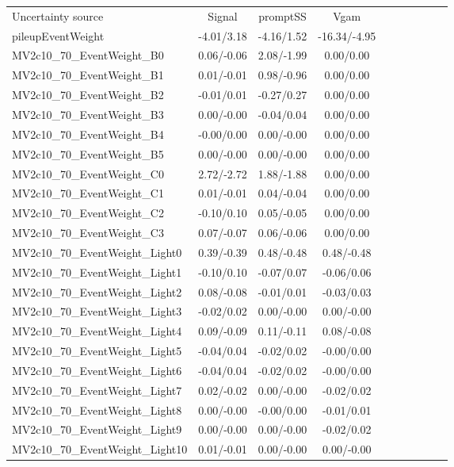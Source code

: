 \begin{table}[h]
\scriptsize
\begin{center}
\begin{tabular}{l|ccccccccc}
\hline
\hline
Uncertainty source &Signal &promptSS &Vgam \\
pileupEventWeight &-4.01/3.18 &-4.16/1.52 &-16.34/-4.95 \\
MV2c10\_70\_EventWeight\_B0 &0.06/-0.06 &2.08/-1.99 &0.00/0.00 \\
MV2c10\_70\_EventWeight\_B1 &0.01/-0.01 &0.98/-0.96 &0.00/0.00 \\
MV2c10\_70\_EventWeight\_B2 &-0.01/0.01 &-0.27/0.27 &0.00/0.00 \\
MV2c10\_70\_EventWeight\_B3 &0.00/-0.00 &-0.04/0.04 &0.00/0.00 \\
MV2c10\_70\_EventWeight\_B4 &-0.00/0.00 &0.00/-0.00 &0.00/0.00 \\
MV2c10\_70\_EventWeight\_B5 &0.00/-0.00 &0.00/-0.00 &0.00/0.00 \\
MV2c10\_70\_EventWeight\_C0 &2.72/-2.72 &1.88/-1.88 &0.00/0.00 \\
MV2c10\_70\_EventWeight\_C1 &0.01/-0.01 &0.04/-0.04 &0.00/0.00 \\
MV2c10\_70\_EventWeight\_C2 &-0.10/0.10 &0.05/-0.05 &0.00/0.00 \\
MV2c10\_70\_EventWeight\_C3 &0.07/-0.07 &0.06/-0.06 &0.00/0.00 \\
MV2c10\_70\_EventWeight\_Light0 &0.39/-0.39 &0.48/-0.48 &0.48/-0.48 \\
MV2c10\_70\_EventWeight\_Light1 &-0.10/0.10 &-0.07/0.07 &-0.06/0.06 \\
MV2c10\_70\_EventWeight\_Light2 &0.08/-0.08 &-0.01/0.01 &-0.03/0.03 \\
MV2c10\_70\_EventWeight\_Light3 &-0.02/0.02 &0.00/-0.00 &0.00/-0.00 \\
MV2c10\_70\_EventWeight\_Light4 &0.09/-0.09 &0.11/-0.11 &0.08/-0.08 \\
MV2c10\_70\_EventWeight\_Light5 &-0.04/0.04 &-0.02/0.02 &-0.00/0.00 \\
MV2c10\_70\_EventWeight\_Light6 &-0.04/0.04 &-0.02/0.02 &-0.00/0.00 \\
MV2c10\_70\_EventWeight\_Light7 &0.02/-0.02 &0.00/-0.00 &-0.02/0.02 \\
MV2c10\_70\_EventWeight\_Light8 &0.00/-0.00 &-0.00/0.00 &-0.01/0.01 \\
MV2c10\_70\_EventWeight\_Light9 &0.00/-0.00 &0.00/-0.00 &-0.02/0.02 \\
MV2c10\_70\_EventWeight\_Light10 &0.01/-0.01 &0.00/-0.00 &0.00/-0.00 \\

\end{tabular}
\end{center}
\end{table}
